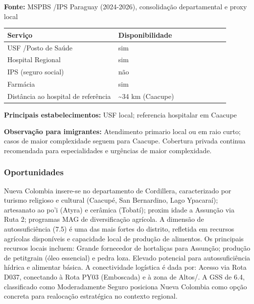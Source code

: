 \textbf{Fonte:} MSPBS /\allowbreak  IPS Paraguay (2024-2026), consolidação
departamental e proxy local

{\def\LTcaptype{none} %
\begin{longtable}{@{}>{\raggedright\arraybackslash}p{0.45\linewidth} >{\raggedright\arraybackslash}p{0.45\linewidth}@{}}
\toprule\noalign{}
Serviço & Disponibilidade \\
\midrule\noalign{}
\endhead
\bottomrule\noalign{}
\endlastfoot
USF /\allowbreak  Posto de Saúde & sim \\
Hospital Regional & sim \\
IPS (seguro social) & não \\
Farmácia & sim \\
Distância ao hospital de referência & \textasciitilde34 km (Caacupe) \\
\end{longtable}
}

\textbf{Principais estabelecimentos:} USF local; referencia hospitalar
em Caacupe

\textbf{Observação para imigrantes:} Atendimento primario local ou em
raio curto; casos de maior complexidade seguem para Caacupe. Cobertura
privada continua recomendada para especialidades e urgências de maior
complexidade.
\newpage

\subsubsection*{Oportunidades}\label{oport-nueva-colombia-0313}
Nueva Colombia insere-se no departamento de Cordillera, caracterizado por turismo religioso e cultural (Caacupé, San Bernardino, Lago Ypacaraí); artesanato ao po'i (Atyra) e cerâmica (Tobatí); proxim idade a Assunção via Ruta 2; programas MAG de diversificação agrícola. A dimensão de autossuficiência (7.5) é uma das mais fortes do distrito, refletida em recursos agrícolas disponíveis e capacidade local de produção de alimentos. Os principais recursos locais incluem: Grande fornecedor de hortaliças para Assunção; produção de petitgrain (óleo essencial) e pedra loza. Elevado potencial para autossuficiência hídrica e alimentar básica. A conectividade logística é dada por: Acesso via Rota D037, conectando à Rota PY03 (Emboscada) e à zona de Altos/. A GSS de 6.4, classificado como Moderadamente Seguro posiciona Nueva Colombia como opção concreta para realocação estratégica no contexto regional.

